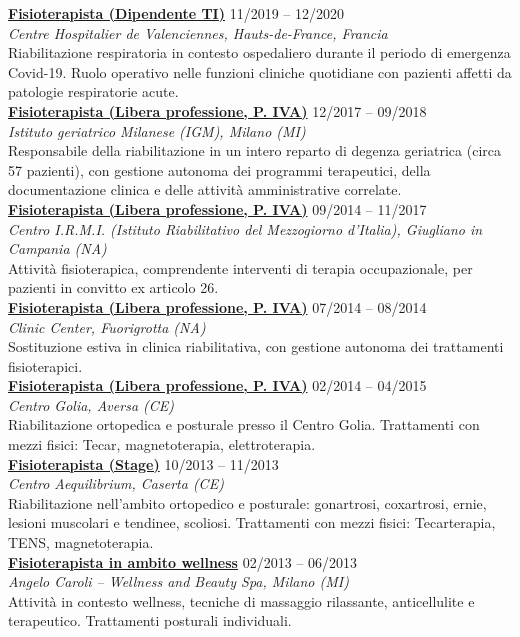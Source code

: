 \documentclass[a4paper]{article}
\newcommand{\voice}[5]{\href{#4}{\textbf{#1}} \hfill #2 \\ \textit{#3} \\ {\small #5} \vspace{0.2cm} \\}
\begin{document}
\begin{minipage}[t]{0.6\columnwidth}
    \voice{Fisioterapista (Dipendente TI)}
    {11/2019 -- 12/2020}
    {Centre Hospitalier de Valenciennes, Hauts-de-France, Francia}
    {https://www.ch-valenciennes.fr/}
    {
    Riabilitazione respiratoria in contesto ospedaliero durante il periodo di emergenza Covid-19. Ruolo operativo nelle funzioni cliniche quotidiane con pazienti affetti da patologie respiratorie acute.%
    }
    \voice{Fisioterapista (Libera professione, P. IVA)}
    {12/2017 -- 09/2018}
    {Istituto geriatrico Milanese (IGM), Milano (MI)}
    {https://www.igm-care.it/service/istituto-geriatrico-milanese/}
    {Responsabile della riabilitazione in un intero reparto di degenza geriatrica (circa 57 pazienti), con gestione autonoma dei programmi terapeutici, della documentazione clinica e delle attività amministrative correlate.}
    \voice{Fisioterapista (Libera professione, P. IVA)}
    {09/2014 -- 11/2017}
    {Centro I.R.M.I. (Istituto Riabilitativo del Mezzogiorno d'Italia), Giugliano in Campania (NA)}
    {https://www.aiopcampania.it/mostrascheda.asp?id=1425}
    {Attività fisioterapica, comprendente interventi di terapia occupazionale, per pazienti in convitto ex articolo 26.}
    \voice{Fisioterapista (Libera professione, P. IVA)}
    {07/2014 -- 08/2014}
    {Clinic Center, Fuorigrotta (NA)}
    {https://cliniccenter.eu/}
    {Sostituzione estiva in clinica riabilitativa, con gestione autonoma dei trattamenti fisioterapici.
    }
    \voice{Fisioterapista (Libera professione, P. IVA)}
    {02/2014 -- 04/2015}
    {Centro Golia, Aversa (CE)}
    {https://centrogolia.com/}
    {
        Riabilitazione ortopedica e posturale presso il Centro Golia.
        Trattamenti con mezzi fisici: Tecar, magnetoterapia, elettroterapia.}
    \voice{Fisioterapista (Stage)}
    {10/2013 -- 11/2013}
    {Centro Aequilibrium, Caserta (CE)}
    {https://www.fisioterapistacaserta.it/About}
    {Riabilitazione nell'ambito ortopedico e posturale:  gonartrosi, coxartrosi, ernie, lesioni muscolari e tendinee, scoliosi.
    Trattamenti con mezzi fisici: Tecarterapia, TENS, magnetoterapia.}
%
    \voice{Fisioterapista in ambito wellness}
    {02/2013 -- 06/2013}
    {Angelo Caroli – Wellness and Beauty Spa, Milano (MI)}
    {https://www.angelocaroli.com/}
    {
    Attività in contesto wellness, tecniche di massaggio rilassante, anticellulite e terapeutico.
    Trattamenti posturali individuali.
    }


\end{minipage}
\end{document}
